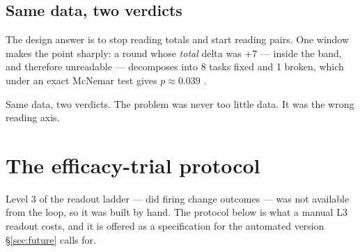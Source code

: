 \subsection*{Same data, two verdicts}

The design answer is to stop reading totals and start reading pairs. One
window makes the point sharply: a round whose \emph{total} delta was $+7$
--- inside the band, and therefore unreadable --- decomposes into 8 tasks
fixed and 1 broken, which under an exact McNemar test gives $p \approx
0.039$ .

Same data, two verdicts. The problem was never too little data. It was the
wrong reading axis.

\section{The efficacy-trial protocol}
\label{sec:efficacy-protocol}

Level 3 of the readout ladder --- did firing change outcomes --- was not
available from the loop, so it was built by hand. The protocol below is
what a manual L3 readout costs, and it is offered as a specification for
the automated version \S\ref{sec:future} calls for.

